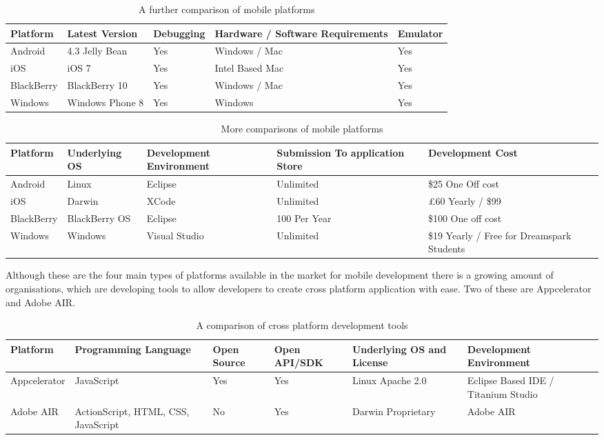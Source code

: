 \begin{table}[H]
  \centering
  \small
  \begin{tabular}{|p{2cm}|p{3.5cm}|p{2.2cm}|p{4.5cm}|p{2cm}|}
  \hline
  \textbf{Platform} & \textbf{Latest Version} & \textbf{Debugging} &
  \textbf{Hardware / Software Requirements} & \textbf{Emulator} \\ \hline
  Android & 4.3 Jelly Bean & Yes & Windows / Mac & Yes \\ \hline
  iOS & iOS 7 & Yes & Intel Based Mac & Yes  \\ \hline
  BlackBerry & BlackBerry 10 & Yes & Windows / Mac & Yes \\ \hline
  Windows & Windows Phone 8 & Yes & Windows & Yes \\ \hline
  \end{tabular}
  \caption {A further comparison of mobile platforms}
\end{table}

\begin{table}[H]
  \centering
  \small
  \begin{tabular}{|p{2cm}|p{2.2cm}|p{3cm}|p{3cm}|p{4cm}|}
  \hline
  \textbf{Platform} & \textbf{Underlying OS} & \textbf{Development
  Environment} & \textbf{Submission To application Store} & \textbf{Development Cost}
  \\ \hline
  Android & Linux & Eclipse & Unlimited & \$25 One Off cost \\ \hline
  iOS & Darwin & XCode & Unlimited & \pounds60 Yearly / \$99 \\ \hline
  BlackBerry & BlackBerry OS & Eclipse & 100 Per Year & \$100 One off cost
  \\ \hline
  Windows & Windows & Visual Studio & Unlimited & \$19 Yearly / Free for
  Dreamspark Students \\ \hline
  \end{tabular}
  \caption{More comparisons of mobile platforms}
\end{table}

Although these are the four main types of platforms available in the market for
mobile development there is a growing amount of organisations, which are
developing tools to allow developers to create cross platform application with
ease. Two of these are Appcelerator and Adobe AIR.

\begin{table}[H]
  \centering
  \small
  \begin{tabular}{|p{2.5cm}|p{2.7cm}|p{1.8cm}|p{2cm}|p{2.8cm}|p{2.8cm}|}
  \hline
  \textbf{Platform} & \textbf{Programming Language} & \textbf{Open Source} &
  \textbf{Open API/SDK} & \textbf{Underlying OS and License} &
  \textbf{Development Environment} \\ \hline
  Appcelerator & JavaScript & Yes & Yes & Linux Apache 2.0 & Eclipse Based
  IDE / Titanium Studio \\ \hline
  Adobe AIR & ActionScript, HTML, CSS, JavaScript & No & Yes & Darwin
  Proprietary & Adobe AIR \\ \hline
  \end{tabular}
  \caption {A comparison of cross platform development tools}
\end{table}

